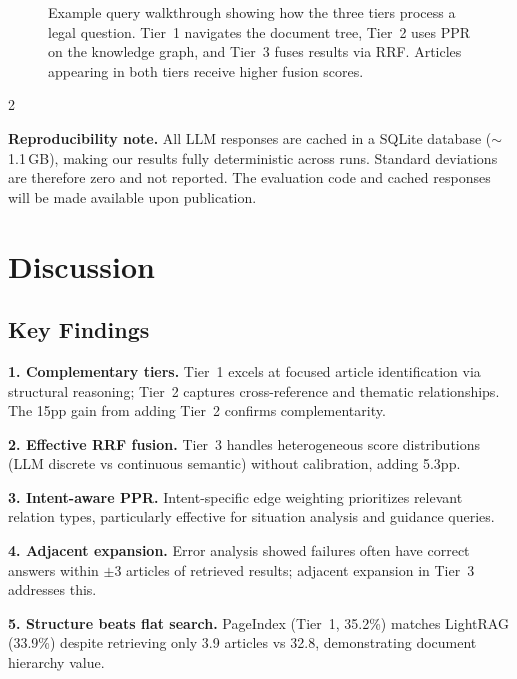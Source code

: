 \documentclass[11pt,a4paper]{article}
\begin{document}
\begin{figure}[H]
{
}
\caption{Example query walkthrough showing how the three tiers process a legal question. Tier~1 navigates the document tree, Tier~2 uses PPR on the knowledge graph, and Tier~3 fuses results via RRF. Articles appearing in both tiers receive higher fusion scores.}
\label{fig:walkthrough}
\end{figure}

\begin{multicols}{2}

\textbf{Reproducibility note.} All LLM responses are cached in a SQLite database ($\sim$1.1\,GB), making our results fully deterministic across runs. Standard deviations are therefore zero and not reported. The evaluation code and cached responses will be made available upon publication.

\section{Discussion}
\label{sec:discussion}

\subsection{Key Findings}

\textbf{1. Complementary tiers.} Tier~1 excels at focused article identification via structural reasoning; Tier~2 captures cross-reference and thematic relationships. The 15pp gain from adding Tier~2 confirms complementarity.

\textbf{2. Effective RRF fusion.} Tier~3 handles heterogeneous score distributions (LLM discrete vs continuous semantic) without calibration, adding 5.3pp.

\textbf{3. Intent-aware PPR.} Intent-specific edge weighting prioritizes relevant relation types, particularly effective for situation analysis and guidance queries.

\textbf{4. Adjacent expansion.} Error analysis showed failures often have correct answers within $\pm$3 articles of retrieved results; adjacent expansion in Tier~3 addresses this.

\textbf{5. Structure beats flat search.} PageIndex (Tier~1, 35.2\%) matches LightRAG (33.9\%) despite retrieving only 3.9 articles vs 32.8, demonstrating document hierarchy value.


\end{multicols}
\end{document}
